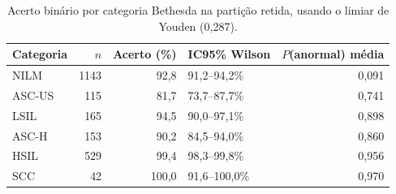 \begin{table}[ht]
\centering
\caption{Acerto binário por categoria Bethesda na partição retida, usando o
limiar de Youden (0,287).}
\label{tab:bethesda}
\small
\setlength{\tabcolsep}{5pt}
\begin{tabular}{lrrlr}
\toprule
Categoria & $n$ & Acerto (\%) & IC95\% Wilson & $P$(anormal) média \\
\midrule
NILM & 1143 & 92,8 & 91,2--94,2\% & 0,091 \\
ASC-US & 115 & 81,7 & 73,7--87,7\% & 0,741 \\
LSIL & 165 & 94,5 & 90,0--97,1\% & 0,898 \\
ASC-H & 153 & 90,2 & 84,5--94,0\% & 0,860 \\
HSIL & 529 & 99,4 & 98,3--99,8\% & 0,956 \\
SCC & 42 & 100,0 & 91,6--100,0\% & 0,970 \\
\bottomrule
\end{tabular}
\end{table}

